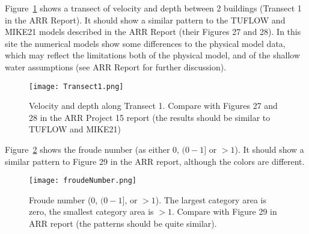 \documentclass{article}
\begin{document}
Figure~\ref{fig:transect1} shows a transect of velocity and depth between 2 buildings (Transect
1 in the ARR Report).  It should show a similar pattern to the TUFLOW and
MIKE21 models described in the ARR Report (their Figures 27 and 28).  In this
site the numerical models show some differences to the physical model data,
which may reflect the limitations both of the physical model, and of the
shallow water assumptions (see ARR Report for further discussion).
\begin{figure}
\texttt{[image: Transect1.png]}
\caption{Velocity and depth along Transect 1. Compare with Figures 27 and 28 
in the ARR Project 15 report (the results should be similar to TUFLOW and
MIKE21)}
\label{fig:transect1}
\end{figure}

Figure~\ref{fig:froude} shows the froude number (as either 0, $(0-1]$ or $>1$).  It
should show a similar pattern to Figure 29 in the ARR report, although the
colors are different. 
\begin{figure}
\center
\texttt{[image: froudeNumber.png]}
\caption{Froude number (0, $(0-1]$, or $>1$). The largest category area is
zero, the smallest category area is $>1$. Compare with Figure 29 in ARR report
(the patterns should be quite similar).}
\label{fig:froude}
\end{figure}
\end{document}
